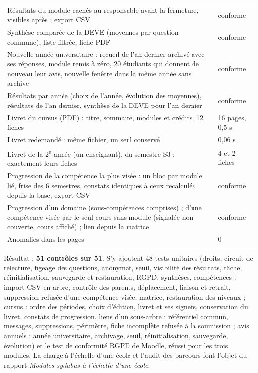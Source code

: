 \documentclass[11pt,a4paper]{article}
\begin{document}
\begin{center}
\begin{tabularx}{\linewidth}{@{}X l@{}}
Résultats du module cachés au responsable avant la fermeture, visibles après ; export CSV &
conforme \\
Synthèse comparée de la DEVE (moyennes par question commune), liste filtrée, fiche PDF &
conforme \\
Nouvelle année universitaire : recueil de l'an dernier archivé avec ses réponses, module remis à
zéro, 20 étudiants qui donnent de nouveau leur avis, nouvelle fenêtre dans la même année sans
archive & conforme \\
Résultats par année (choix de l'année, évolution des moyennes), résultats de l'an dernier,
synthèse de la DEVE pour l'an dernier & conforme \\
Livret du cursus (PDF) : titre, sommaire, modules et crédits, 12 fiches & 16 pages, 0,5 s \\
Livret redemandé : même fichier, un seul conservé & 0,06 s \\
Livret de la 2\textsuperscript{e} année (un enseignant), du semestre S3 : exactement leurs
fiches & 4 et 2 fiches \\
Progression de la compétence la plus visée : un bloc par module lié, frise des 6 semestres,
constats identiques à ceux recalculés depuis la base, export CSV & conforme \\
Progression d'un domaine (sous-compétences comprises) ; d'une compétence visée par le seul
cours sans module (signalée non couverte, cours affiché) ; lien depuis la matrice & conforme \\
Anomalies dans les pages & 0 \\
\bottomrule
\end{tabularx}
\end{center}

Résultat : \textbf{51 contrôles sur 51}. S'y ajoutent 48 tests unitaires (droits, circuit de
relecture, figeage des questions, anonymat, seuil, visibilité des résultats, tâche,
réinitialisation, sauvegarde et restauration, RGPD, synthèses, compétences : import CSV en
arbre, contrôle des parents, déplacement, liaison et retrait, suppression refusée d'une
compétence visée, matrice, restauration des niveaux ; cursus : ordre des périodes, choix
d'édition, livret et ses signets, conservation du livret, constats de progression, liens d'un
sous-arbre ; référentiel commun, messages, suppressions, périmètre, fiche incomplète refusée à
la soumission ; avis annuels : année universitaire, archivage, seuil, réinitialisation,
sauvegarde, évolution) et le test de conformité RGPD de Moodle, réussi pour les trois modules. La
charge à l'échelle d'une école et l'audit des parcours font l'objet du rapport \emph{Modules
syllabus à l'échelle d'une école}.
\end{document}
